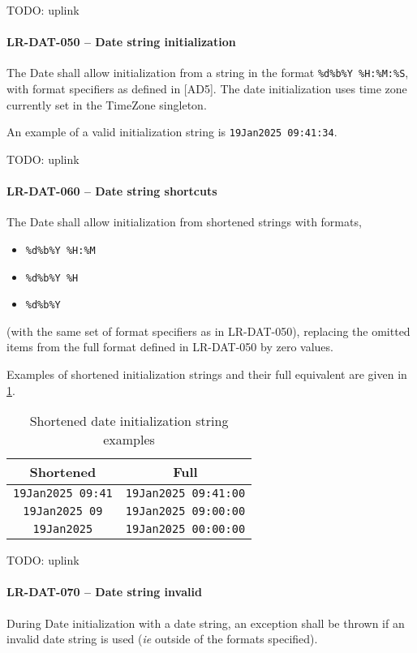 TODO: uplink

\paragraph{LR-DAT-050 -- Date string initialization}
The Date shall allow initialization from a string in the format
\lstinline{%d%b%Y %H:%M:%S}, with format specifiers as defined in [AD5].
The date initialization uses time zone currently set
in the TimeZone singleton.

An example of a valid initialization string is \lstinline {19Jan2025 09:41:34}.

TODO: uplink

\paragraph{LR-DAT-060 -- Date string shortcuts}
The Date shall allow initialization from shortened strings
with formats,
\begin{itemize}
\item \lstinline{%d%b%Y %H:%M}
\item \lstinline{%d%b%Y %H}
\item \lstinline{%d%b%Y}
\end{itemize}
(with the same set of format specifiers as in LR-DAT-050),
replacing the omitted items from the full format defined in LR-DAT-050
by zero values.

Examples of shortened initialization strings and their full equivalent are
given in \cref{tab:date_shortened}.

\begin{table}
  \caption{\label{tab:date_shortened}
    Shortened date initialization string examples}
  \begin{tabular}{| c | c |} \hline
    \textbf{Shortened} & \textbf{Full} \\ \hline
    \texttt{19Jan2025 09:41} & \texttt{19Jan2025 09:41:00} \\ \hline
    \texttt{19Jan2025 09} & \texttt{19Jan2025 09:00:00} \\ \hline
    \texttt{19Jan2025} & \texttt{19Jan2025 00:00:00} \\ \hline
  \end{tabular}\end{table}

TODO: uplink

\paragraph{LR-DAT-070 -- Date string invalid}
During Date initialization with a date string, an exception shall be
thrown if an invalid date string is used (\textit{ie} outside of the formats
specified).

